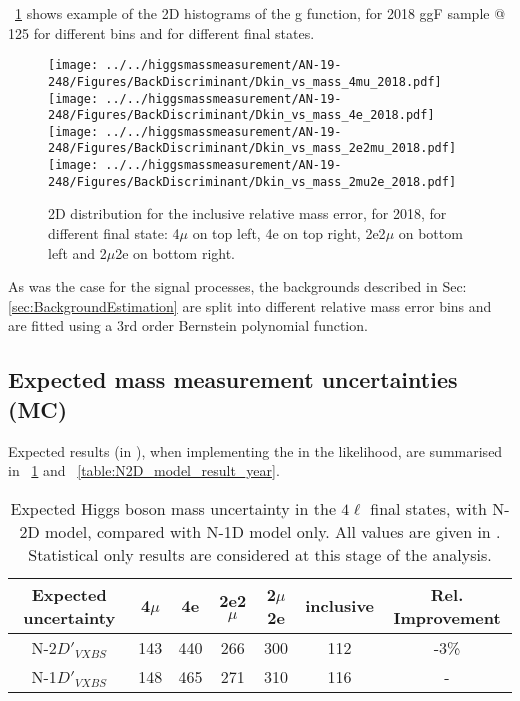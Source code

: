 \figurename~\ref{2D_distribution} shows example of the 2D histograms of the g function, for 2018 ggF sample @ 125 \GeV
for different bins and for different final states.
\begin{figure}[!htbp]
\begin{center}
	\texttt{[image: ../../higgsmassmeasurement/AN-19-248/Figures/BackDiscriminant/Dkin\_vs\_mass\_4mu\_2018.pdf]}
	\texttt{[image: ../../higgsmassmeasurement/AN-19-248/Figures/BackDiscriminant/Dkin\_vs\_mass\_4e\_2018.pdf]}
	\texttt{[image: ../../higgsmassmeasurement/AN-19-248/Figures/BackDiscriminant/Dkin\_vs\_mass\_2e2mu\_2018.pdf]}
\texttt{[image: ../../higgsmassmeasurement/AN-19-248/Figures/BackDiscriminant/Dkin\_vs\_mass\_2mu2e\_2018.pdf]}
\caption{
2D distribution for the inclusive relative mass error, for 2018, for different final state:
4$\mu$ on top left, 4e on top right, 2e2$\mu$ on bottom left and 2$\mu$2e on bottom right.}
\label{2D_distribution}
\end{center}
\end{figure}

As was the case for the signal processes, the backgrounds described in Sec: \ref{sec:BackgroundEstimation} are split into different relative mass error bins and are fitted using a 3rd order Bernstein polynomial function.

\subsection{Expected mass measurement uncertainties (MC)}
Expected results (in \MeV), when implementing the \Dkinbkg in the likelihood, 
are summarised in \tablename~\ref{table:N2D_model_result}
and \tablename~\ref{table:N2D_model_result_year}.
\begin{table}[ht]	
\begin{center}
\begin{tabular}{|c|cccc|c|c|}
\hline			
Expected uncertainty	&	4$\mu$	&	4e	&	2e2$\mu$	&2$\mu$2e	& inclusive	&	 Rel. Improvement \\
\hline			
N-2$D'_{VXBS}$	&	143	&	440	&	266	&	300	&	112	&	-3\%	\\
N-1$D'_{VXBS}$	&	148	&	465	&	271	&	310	&	116	&	-	\\
\hline
\end{tabular}
\end{center}
\caption{Expected Higgs boson mass uncertainty in the $4\ell$ final states, 
	with N-2D model, compared with N-1D model only.
	All values are given in \MeV.  
Statistical only results are considered at this stage of the analysis.}
\label{table:N2D_model_result}
\end{table}

